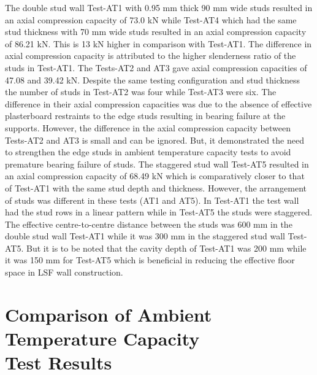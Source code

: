 The double stud wall Test-AT1 with 0.95 mm thick 90 mm wide studs resulted in an axial compression capacity of 73.0 kN while Test-AT4 which had the same stud thickness with 70 mm wide studs resulted in an axial compression capacity of 86.21 kN. This is 13 kN higher in comparison with Test-AT1. The difference in axial compression capacity is attributed to the higher slenderness ratio of the studs in Test-AT1. The Tests-AT2 and AT3 gave axial compression capacities of 47.08 and 39.42 kN. Despite the same testing configuration and stud thickness the number of studs in Test-AT2 was four while Test-AT3 were six. The difference in their axial compression capacities was due to the absence of effective plasterboard restraints to the edge studs resulting in bearing failure at the supports. However, the difference in the axial compression capacity between Tests-AT2 and AT3 is small and can be ignored. But, it demonstrated the need to strengthen the edge studs in ambient temperature capacity tests to avoid premature bearing failure of studs. The staggered stud wall Test-AT5 resulted in an axial compression capacity of 68.49 kN which is comparatively closer to that of Test-AT1 with the same stud depth and thickness. However, the arrangement of studs was different in these tests (AT1 and AT5). In Test-AT1 the test wall had the stud rows in a linear pattern while in Test-AT5 the studs were staggered. The effective centre-to-centre distance between the studs was 600 mm in the double stud wall Test-AT1 while it was 300 mm in the staggered stud wall Test-AT5. But it is to be noted that the cavity depth of Test-AT1 was 200 mm while it was 150 mm for Test-AT5 which is beneficial in reducing the effective floor space in LSF wall construction.

\section[Comparison of Ambient Temperature Capacity Test Results]{Comparison of Ambient Temperature Capacity \\Test Results}

